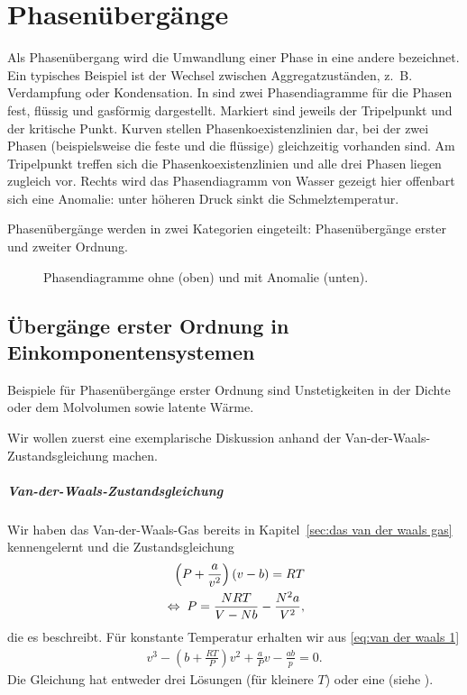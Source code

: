 
\chapter{Phasenübergänge\label{sec:phasenuebergaenge}}

Als Phasenübergang wird die Umwandlung einer Phase in eine andere bezeichnet. Ein typisches Beispiel ist der Wechsel zwischen Aggregatzuständen, z.~B. Verdampfung oder Kondensation. In  sind zwei Phasendiagramme für die Phasen fest, flüssig und gasförmig dargestellt. Markiert sind jeweils der Tripelpunkt und der kritische Punkt. Kurven stellen Phasenkoexistenzlinien dar, bei der zwei Phasen (beispielsweise die feste und die flüssige) gleichzeitig vorhanden sind. Am Tripelpunkt treffen sich die Phasenkoexistenzlinien und alle drei Phasen liegen zugleich vor. Rechts wird das Phasendiagramm von Wasser gezeigt \textendash{} hier offenbart sich eine Anomalie: unter höheren Druck sinkt die Schmelztemperatur.

Phasenübergänge werden in zwei Kategorien eingeteilt: Phasenübergänge erster und zweiter Ordnung.

\begin{figure}[htbp]
    \centering
    \tfigPhaseDiagramNoAnomaly

    \tfigPhaseDiagramWithAnomaly
    \caption{Phasendiagramme ohne (oben) und mit Anomalie (unten). }
    \label{fig:Phasendiagramme}
\end{figure}




\section{Übergänge erster Ordnung in Einkomponentensystemen}

Beispiele für Phasenübergänge erster Ordnung sind Unstetigkeiten in der Dichte oder dem Molvolumen sowie latente Wärme.

Wir wollen zuerst eine exemplarische Diskussion anhand der Van-der-Waals-Zustandsgleichung machen.


\paragraph*{Van-der-Waals-Zustandsgleichung}

Wir haben das Van-der-Waals-Gas bereits in Kapitel~\ref{sec:das van der waals gas}  kennengelernt und die Zustandsgleichung
\begin{align}
    \label{eq:van der waals 1}
    \left( P+\frac{a}{v^2}  \right) (v-b) =RT \\
    \label{eq:van der waals 2}
    \;\Leftrightarrow\; P=\frac{NRT}{V-Nb}-\frac{N^2a}{V^2},
\end{align}
die es beschreibt. Für konstante Temperatur erhalten wir aus \eqref{eq:van der waals 1}
\begin{align}
    \label{eq:van der waals isotherme}
    v^3-\left( b+\frac{RT}{P} \right)v^2+\frac{a}{P}v-\frac{ab}{p} = 0.
\end{align}
Die Gleichung hat entweder drei Lösungen (für kleinere $T$) oder eine (siehe ).

